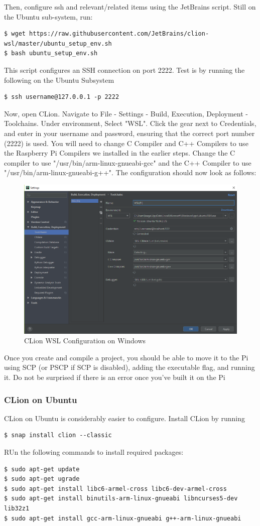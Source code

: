 Then, configure ssh and relevant/related items using the JetBrains script. Still on the Ubuntu sub-system, run:
\begin{lstlisting}
$ wget https://raw.githubusercontent.com/JetBrains/clion-wsl/master/ubuntu_setup_env.sh
$ bash ubuntu_setup_env.sh
\end{lstlisting}

This script configures an SSH connection on port 2222. Test is by running the following on the Ubuntu Subsystem
\begin{lstlisting}
$ ssh username@127.0.0.1 -p 2222
\end{lstlisting}

Now, open CLion. Navigate to File - Settings - Build, Execution, Deployment - Toolchains. Under environment, Select "WSL". Click the gear next to Credentials, and enter in your username and password, ensuring that the correct port number (2222) is used. You will need to change C Compiler and C++ Compilers to use the Raspberry Pi Compilers we installed in the earlier steps. Change the C compiler to use "/usr/bin/arm-linux-gnueabi-gcc" and the C++ Compiler to use "/usr/bin/arm-linux-gnueabi-g++". The configuration should now look as follows:
\begin{figure}[H]
\centering
\includegraphics[width=0.8\columnwidth]{Figures/WSLConfig}
\caption{CLion WSL Configuration on Windows}
\label{fig:WSLConfig}
\end{figure}

Once you create and compile a project, you should be able to move it to the Pi using SCP (or PSCP if SCP is disabled), adding the executable flag, and running it. Do not be surprised if there is an error once you've built it on the Pi 

\subsubsection{CLion on Ubuntu}
CLion on Ubuntu is considerably easier to configure. 
Install CLion by running
\begin{lstlisting}
$ snap install clion --classic
\end{lstlisting}
RUn the following commands to install required packages:
\begin{lstlisting}
$ sudo apt-get update 
$ sudo apt-get ugrade
$ sudo apt-get install libc6-armel-cross libc6-dev-armel-cross 
$ sudo apt-get install binutils-arm-linux-gnueabi libncurses5-dev lib32z1
$ sudo apt-get install gcc-arm-linux-gnueabi g++-arm-linux-gnueabi
\end{lstlisting}

